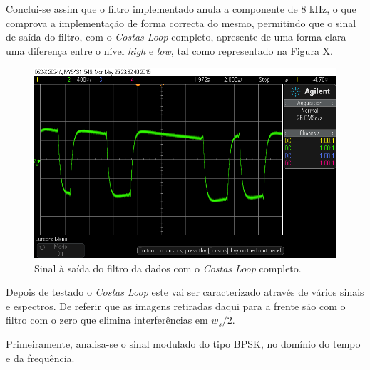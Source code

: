 \documentclass[11pt]{article}
\numberwithin{equation}{section}
\begin{document}
{Conclui-se assim que o filtro implementado anula a componente de 8 kHz, o que comprova a implementação de forma correcta do mesmo, permitindo que o sinal de saída do filtro, com o \textit{Costas Loop} completo, apresente de uma forma clara uma diferença entre o nível \textit{high} e \textit{low}, tal como representado na Figura X.

\begin{figure}[H]
	\centering
	\includegraphics[keepaspectratio=true, scale=0.37]{exps/pulse_saida_filtro_Sine_mudancanoFiltro}
	\caption{Sinal à saída do filtro da dados com o \textit{Costas Loop} completo.}
	\vspace{-0.8em}
\end{figure}

Depois de testado o \textit{Costas Loop} este vai ser caracterizado através de vários sinais e espectros. De referir que as imagens retiradas daqui para a frente são com o filtro com o zero que elimina interferências em $w_{s}/2$. 

Primeiramente, analisa-se o sinal modulado do tipo BPSK, no domínio do tempo e da frequência.

}
\end{document}
